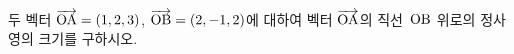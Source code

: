 두 벡터 $\overrightarrow{\mathrm{OA}}=(1{,}\mkern3mu\mathopen{}2{,}\mkern3mu\mathopen{}3)$, $\overrightarrow{\mathrm{OB}}=(2{,}\mkern3mu\mathopen{}-1{,}\mkern3mu\mathopen{}2)$에 대하여 벡터 $\overrightarrow{\mathrm{OA}}$의 직선~$\mathrm{OB}$ 위로의 정사영의 크기를 구하시오.
